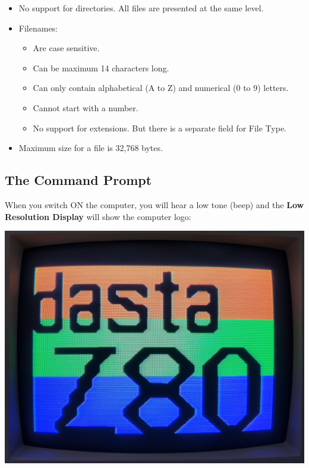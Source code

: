 \documentclass[a4paper,11pt]{article}
\begin{document}
    \begin{itemize}
        \item No support for directories. All files are presented at the same
        level.
        \item Filenames:
        \begin{itemize}
            \item Are case sensitive.
            \item Can be maximum 14 characters long.
            \item Can only contain alphabetical (A to Z) and numerical (0 to 9)
            letters.
            \item Cannot start with a number.
            \item No support for extensions. But there is a separate field for
            File Type.
        \end{itemize}
        \item Maximum size for a file is 32,768 bytes.
    \end{itemize}
        
    \pagebreak
    \subsection{The Command Prompt}
    When you switch ON the computer, you will hear a low tone (beep) and the
    \textbf{Low Resolution Display} will show the computer logo:

    \includegraphics[scale=0.2]{dastaZ80logoOnVDP.png}
\end{document}
